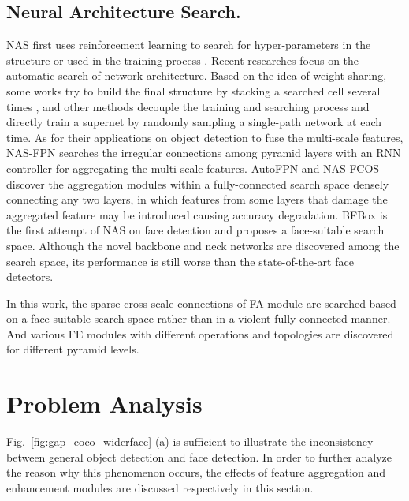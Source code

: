 \documentclass[sigconf]{acmart}
\begin{document}
\subsection{Neural Architecture Search.}
NAS first uses reinforcement learning to search for hyper-parameters in the structure or used in the training process \cite{zoph2016neural,zoph2018learning,tan2019efficientnet}. Recent researches focus on the automatic search of network architecture. Based on the idea of weight sharing, some works try to build the final structure by stacking a searched cell several times \cite{liu2018darts,xu2019pcdarts}, and other methods \cite{guo2019spos,chu2019fairnas,cai2019once,liu2020bfbox,chen2019detnas} decouple the training and searching process and directly train a supernet by randomly sampling a single-path network at each time.
As for their applications on object detection to fuse the multi-scale features, NAS-FPN \cite{ghiasi2019nasfpn} searches the irregular connections among pyramid layers with an RNN controller for aggregating the multi-scale features. AutoFPN \cite{xu2019autofpn} and NAS-FCOS \cite{wang2019nasfcos} discover the aggregation modules within a fully-connected search space densely connecting any two layers, in which features from some layers that damage the aggregated feature may be introduced causing accuracy degradation.
BFBox \cite{liu2020bfbox} is the first attempt of NAS on face detection and proposes a face-suitable search space. Although the novel backbone and neck networks are discovered among the search space, its performance is still worse than the state-of-the-art face detectors.






In this work, the sparse cross-scale connections of FA module are searched based on a face-suitable search space rather than in a violent fully-connected manner. And various FE modules with different operations and topologies are discovered for different pyramid levels.

\section{Problem Analysis}\label{sec:problem}
Fig.~\ref{fig:gap_coco_widerface} (a) is sufficient to illustrate the inconsistency between general object detection and face detection. In order to further analyze the reason why this phenomenon occurs, the effects of feature aggregation and enhancement modules are discussed respectively in this section.
\end{document}
